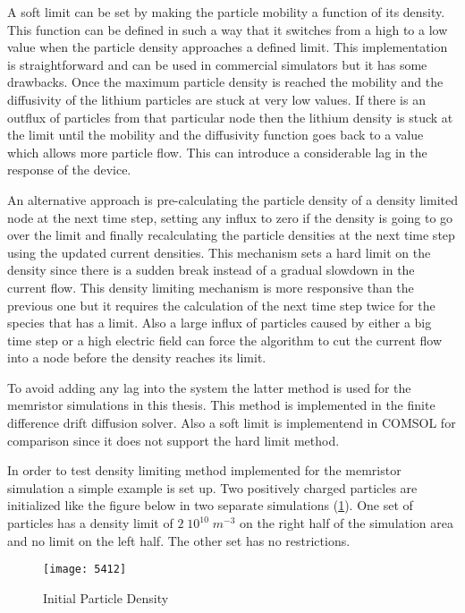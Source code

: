 \begin{doublespace}
A soft limit can be set by making the particle mobility a function of its density. This function can be defined in such a way that it switches from a high to a low value when the particle density approaches a defined limit. This implementation is straightforward and can be used in commercial simulators but it has some drawbacks. Once the maximum particle density is reached the mobility and the diffusivity of the lithium particles are stuck at very low values. If there is an outflux of particles from that particular node then the lithium density is stuck at the limit until the mobility and the diffusivity function goes back to a value which allows more particle flow. This can introduce a considerable lag in the response of the device.  

An alternative approach is pre-calculating the particle density of a density limited node at the next time step, setting any influx to zero if the density is going to go over the limit and finally recalculating the particle densities at the next time step using the updated current densities. This mechanism sets a hard limit on the density since there is a sudden break instead of a gradual slowdown in the current flow. This density limiting mechanism is more responsive than the previous one but it requires the calculation of the next time step twice for the species that has a limit. Also a large influx of particles caused by either a big time step or a high electric field can force the algorithm to cut the current flow into a node before the density reaches its limit.

To avoid adding any lag into the system the latter method is used for the memristor simulations in this thesis. This method is implemented in the finite difference drift diffusion solver. Also a soft limit is implementend in COMSOL for comparison since it does not support the hard limit method.  

In order to test density limiting method implemented for the memristor simulation a simple example is set up. Two positively charged particles are initialized like the figure below in two separate simulations (\ref{5412}). One set of particles has a density limit of $2 \; 10^{10} \; m^{-3}$ on the right half of the simulation area and no limit on the left half. The other set has no restrictions.
\begin{figure}[!htp]
\centering
\texttt{[image: 5412]}
\caption{Initial Particle Density} 
\label{5412}
\end{figure}


\end{doublespace}
